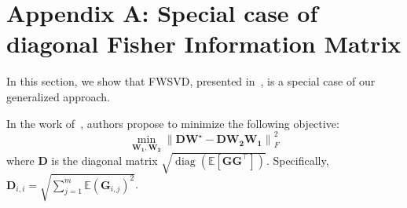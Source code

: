 \documentclass{article}
\begin{document}






\newpage





\appendix
\section{Appendix A: Special case of diagonal Fisher Information Matrix}
\label{sec:appendix0}
In this section, we show that FWSVD, presented in~\cite{FWSVD}, is a special case of our generalized approach. 

In the work of~\cite{FWSVD}, authors propose to minimize the following objective:
\begin{equation}\label{eq:fwsvd}
    \underset{\mathbf{W_1,W_2}}{\min}  \left\| 
    \mathbf{D}\mathbf{W}^{\star} - \mathbf{D}\mathbf{W_2}\mathbf{W_1} \right\| _F^2
\end{equation} where $\mathbf{D}$ is the diagonal matrix $\sqrt {\operatorname{diag}\left(\mathbb{E} [\mathbf{G} \mathbf{G}^\top] \right)}$.
Specifically, $\mathbf{D}_{i,i} = \sqrt{\sum_{j=1}^m \mathbb{E} (\mathbf{G}_{i,j})^2 }$.
\end{document}
